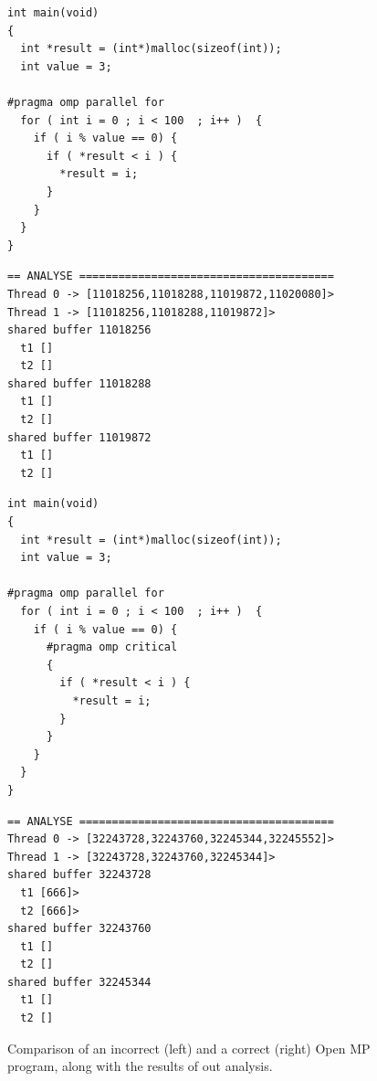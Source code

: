 \begin{figure}
  \centering
  \lstset{language=C, basicstyle=\small}

  \begin{minipage}{.45\textwidth}
    \begin{lstlisting}
int main(void) 
{
  int *result = (int*)malloc(sizeof(int));
  int value = 3;
  
#pragma omp parallel for 
  for ( int i = 0 ; i < 100  ; i++ )  {
    if ( i % value == 0) {
      if ( *result < i ) {
        *result = i;
      }
    }
  }
}
    \end{lstlisting}
    \vspace{8mm}
    \lstset{basicstyle=\scriptsize}
    \begin{lstlisting}
== ANALYSE =======================================
Thread 0 -> [11018256,11018288,11019872,11020080]>
Thread 1 -> [11018256,11018288,11019872]>
shared buffer 11018256
  t1 []
  t2 []
shared buffer 11018288
  t1 []
  t2 []
shared buffer 11019872
  t1 []
  t2 []
    \end{lstlisting}
  \end{minipage}
  \hspace{.025\textwidth}
  \hspace{.025\textwidth}
  \begin{minipage}{.45\textwidth}
    \begin{lstlisting}
int main(void) 
{
  int *result = (int*)malloc(sizeof(int));
  int value = 3;
  
#pragma omp parallel for 
  for ( int i = 0 ; i < 100  ; i++ )  {
    if ( i % value == 0) {
      #pragma omp critical 
      {
        if ( *result < i ) {
          *result = i;
        }
      }
    }
  }
}
    \end{lstlisting}
    \lstset{basicstyle=\scriptsize}
    \begin{lstlisting}
== ANALYSE =======================================
Thread 0 -> [32243728,32243760,32245344,32245552]>
Thread 1 -> [32243728,32243760,32245344]>
shared buffer 32243728
  t1 [666]>
  t2 [666]>
shared buffer 32243760
  t1 []
  t2 []
shared buffer 32245344
  t1 []
  t2 []
    \end{lstlisting}
  \end{minipage}
  \caption{Comparison of an incorrect (left) and a correct (right)
    Open MP program, along with the results of out analysis.}
  \label{fig:openmp}
\end{figure}